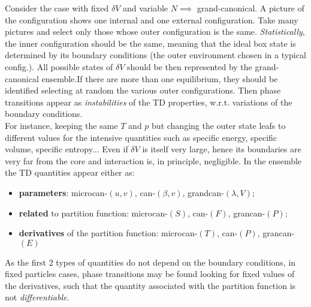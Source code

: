 \documentclass{article}
\begin{document}
Consider the case with fixed $\delta V$ and variable $N \implies$ grand-canonical. A picture of the configuration shows one internal and one external configuration. Take many pictures and select only those whose outer configuration is the same. \textit{Statistically}, the inner configuration should be the same, meaning that the ideal box state is determined by its boundary conditions (the outer environment chosen in a typical config.). All possible states of $\delta V$ should be then represented by the grand-canonical ensemble.If there are more than one equilibrium, they should be identified selecting at random the various outer configurations. Then phase transitions appear as \textit{instabilities} of the TD properties, w.r.t. variations of the boundary conditions.\\
For instance, keeping the same $T$ and $p$ but changing the outer state leafs to different values for the intensive quantities such as specific energy, specific volume, specific entropy... Even if $\delta V$ is itself very large, hence its boundaries are very far from the core and interaction is, in principle, negligible. In the ensemble the TD quantities appear either as:
\begin{itemize}
\item \textbf{parameters}: microcan-$(u,v)$, can-$(\beta,v)$, grandcan-$(\lambda,V)$;   
\item \textbf{related} to partition function: microcan-$(S)$, can-$(F)$, grancan-$(P)$;
\item \textbf{derivatives} of the partition function:
microcan-$(T)$, can-$(P)$, grancan-$(E)$
\end{itemize}
As the first 2 types of quantities do not depend on the boundary conditions, in fixed particles cases, phase transitions may be found looking for fixed values of the derivatives, such that the quantity associated with the partition function is not \textit{differentiable}.
\end{document}
